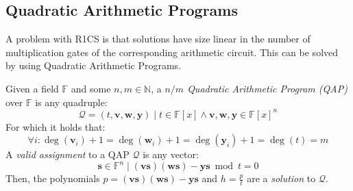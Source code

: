 \subsection{Quadratic Arithmetic Programs}
A problem with R1CS is that solutions have size linear in the number of multiplication gates of
the corresponding arithmetic circuit.
This can be solved by using Quadratic Arithmetic Programs.
\begin{definition}
	Given a field \(\mathbb{F}\) and some \(n,m \in \mathbb{N}\), a
	\emph{\(n/m\) Quadratic Arithmetic Program (QAP)} over \(\mathbb{F}\) is any quadruple:
	\[ \mathcal{Q} = (t, \bm{v}, \bm{w}, \bm{y}) \mid {t \in \mathbb{F}[x]} \land
		{\bm{v},\bm{w},\bm{y} \in {\mathbb{F}[x]}^n}\]
	For which it holds that:
	\[\forall i\colon \deg(\bm{v}_i)+1 = \deg(\bm{w}_i)+1 = \deg(\bm{y}_i)+1 = \deg(t) = m\]
	A \emph{valid assignment} to a QAP \(\mathcal{Q}\) is any vector:
	\[\bm{s} \in \mathbb{F}^n \mid (\bm{v}\bm{s})(\bm{w}\bm{s}) - \bm{y}\bm{s} \bmod t = 0\]
	Then, the polynomials \(p = (\bm{v}\bm{s})(\bm{w}\bm{s}) - \bm{y}\bm{s}\)
	and \(h = \frac{p}{t}\) are a \emph{solution} to \(\mathcal{Q}\).
\end{definition}

